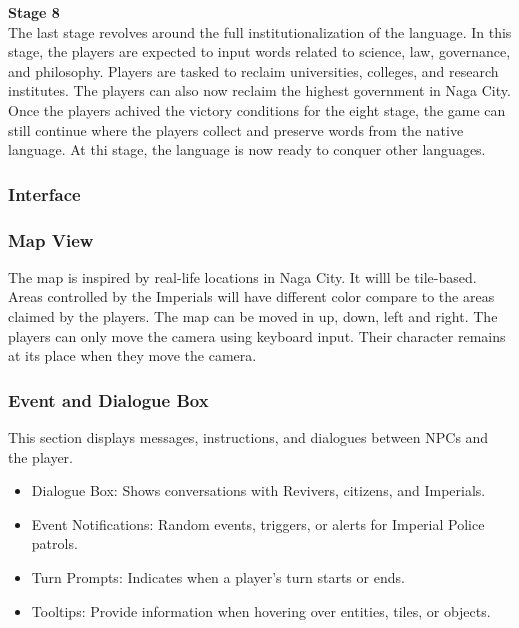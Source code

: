 \documentclass[11pt]{article}
\begin{document}
\textbf{Stage 8}\\
The last stage revolves around  the full institutionalization of the language. In this stage, the players are expected to input words related to science, law, governance, and philosophy. Players are tasked to reclaim universities, colleges, and research institutes. The players can also now reclaim the highest government in Naga City.\\

Once the players achived the victory conditions for the eight stage, the game can still continue where the players collect and preserve words from the native language. At thi stage, the language is now ready to conquer other languages.\\

\subsubsection{Interface}

\subsubsection{Map View}
The map is inspired by real-life locations in Naga City. It willl be tile-based. Areas controlled by the Imperials will have different color compare to the areas claimed by the players. The map can be moved in up, down, left and right. The players can only move the camera using keyboard input. Their character remains at its place when they move the camera.

\subsubsection{Event and Dialogue Box}
This section displays messages, instructions, and dialogues between NPCs and the player.
\begin{itemize}
\item Dialogue Box: Shows conversations with Revivers, citizens, and Imperials.
\item Event Notifications: Random events, triggers, or alerts for Imperial Police patrols.
\item Turn Prompts: Indicates when a player’s turn starts or ends.
\item Tooltips: Provide information when hovering over entities, tiles, or objects.
\end{itemize}
\end{document}
